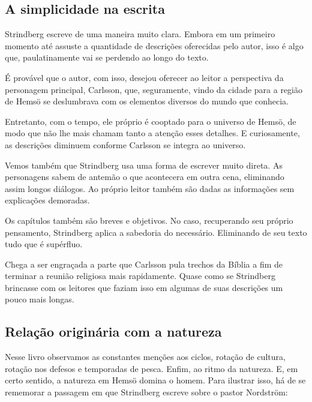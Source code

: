 \documentclass[12pt]{extarticle}
\begin{document}


\subsection{A simplicidade na escrita}

Strindberg escreve de uma maneira muito clara. Embora em um primeiro
momento até assuste a quantidade de descrições oferecidas pelo autor,
isso é algo que, paulatinamente vai se perdendo ao longo do texto.

É provável que o autor, com isso, desejou oferecer ao leitor a
perspectiva da personagem principal, Carlsson, que, seguramente, vindo
da cidade para a região de Hemsö se deslumbrava com os elementos
diversos do mundo que conhecia.

Entretanto, com o tempo, ele próprio é cooptado para o universo de
Hemsö, de modo que não lhe mais chamam tanto a atenção esses detalhes. E
curiosamente, as descrições diminuem conforme Carlsson se integra ao
universo.

Vemos também que Strindberg usa uma forma de escrever muito direta. As
personagens sabem de antemão o que acontecera em outra cena, eliminando
assim longos diálogos. Ao próprio leitor também são dadas as informações
sem explicações demoradas.

Os capítulos também são breves e objetivos. No caso, recuperando seu
próprio pensamento, Strindberg aplica a sabedoria do necessário.
Eliminando de seu texto tudo que é supérfluo.

Chega a ser engraçada a parte que Carlsson pula trechos da Bíblia a fim
de terminar a reunião religiosa mais rapidamente. Quase como se
Strindberg brincasse com os leitores que faziam isso em algumas de suas
descrições um pouco mais longas.

\subsection{Relação originária com a natureza}

Nesse livro observamos as constantes menções aos ciclos, rotação de
cultura, rotação nos defesos e temporadas de pesca. Enfim, ao ritmo da
natureza. E, em certo sentido, a natureza em Hemsö domina o homem. Para
ilustrar isso, há de se rememorar a passagem em que Strindberg escreve
sobre o pastor Nordström:
\end{document}
